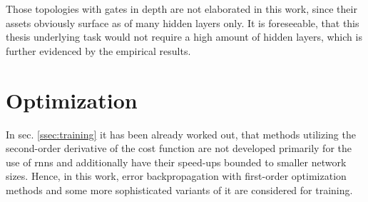 Those topologies with gates in depth are not elaborated in this work, since their assets obviously surface as of many hidden layers only.
It is foreseeable, that this thesis underlying task would not require a high amount of hidden layers, which is further evidenced by the empirical results.

\section{Optimization}
\label{sec:opt}
In sec. \ref{ssec:training} it has been already worked out, that methods utilizing the second-order derivative of the cost function are not developed primarily for the use of \glspl{rnn} and additionally have their speed-ups bounded to smaller network sizes.
Hence, in this work, error backpropagation with first-order optimization methods and some more sophisticated variants of it are considered for training.

